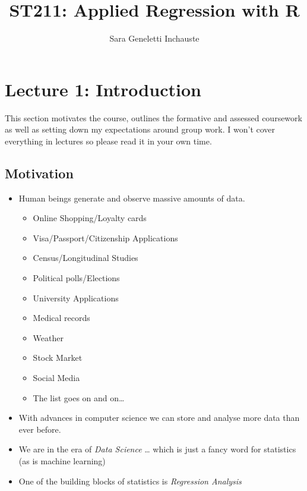 \documentclass[
]{gitbook}
\title{ST211: Applied Regression with R}
\author{Sara Geneletti Inchauste}
\date{}
\providecommand{\tightlist}{%
  \setlength{\itemsep}{0pt}\setlength{\parskip}{0pt}}
\begin{document}
\maketitle

{
\setcounter{tocdepth}{2}
\tableofcontents
}
\hypertarget{lecture-1-introduction}{%
\section{Lecture 1: Introduction}\label{lecture-1-introduction}}

This section motivates the course, outlines the formative and assessed coursework as well as setting down my expectations around group work. I won't cover everything in lectures so please read it in your own time.

\hypertarget{motivation}{%
\subsection{Motivation}\label{motivation}}

\begin{itemize}
\tightlist
\item
  Human beings generate and observe massive amounts of data.

  \begin{itemize}
  \tightlist
  \item
    Online Shopping/Loyalty cards
  \item
    Visa/Passport/Citizenship Applications
  \item
    Census/Longitudinal Studies
  \item
    Political polls/Elections
  \item
    University Applications
  \item
    Medical records
  \item
    Weather
  \item
    Stock Market
  \item
    Social Media
  \item
    The list goes on and on\ldots{}
  \end{itemize}
\item
  With advances in computer science we can store and analyse more data than ever before.
\item
  We are in the era of \emph{Data Science} \ldots{} which is just a fancy word for statistics (as is machine learning)
\item
  One of the building blocks of statistics is \emph{Regression Analysis}
\end{itemize}
\end{document}
